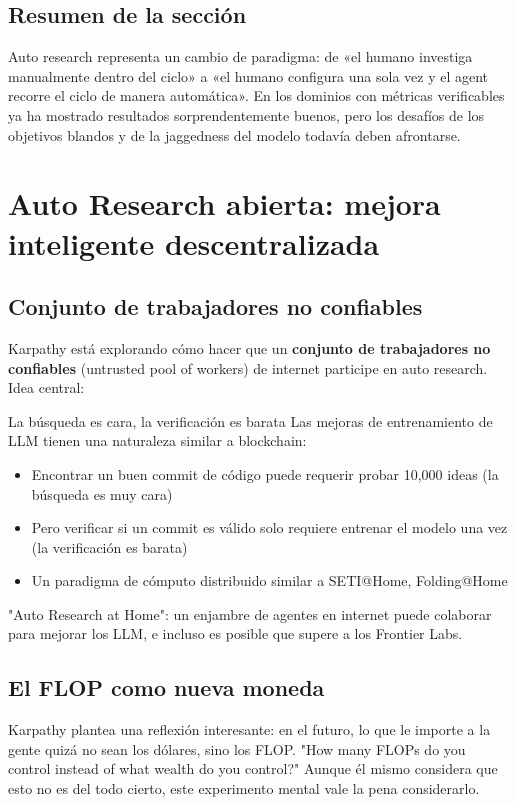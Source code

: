 \documentclass[a4paper]{article}
\begin{document}
\subsection{Resumen de la sección}

Auto research representa un cambio de paradigma: de «el humano investiga manualmente dentro del ciclo» a «el humano configura una sola vez y el agent recorre el ciclo de manera automática». En los dominios con métricas verificables ya ha mostrado resultados sorprendentemente buenos, pero los desafíos de los objetivos blandos y de la jaggedness del modelo todavía deben afrontarse.
\section{Auto Research abierta: mejora inteligente descentralizada}

\subsection{Conjunto de trabajadores no confiables}

Karpathy está explorando cómo hacer que un \textbf{conjunto de trabajadores no confiables} (untrusted pool of workers) de internet participe en auto research. Idea central:

\begin{importantbox}{La búsqueda es cara, la verificación es barata}
Las mejoras de entrenamiento de LLM tienen una naturaleza similar a blockchain:
\begin{itemize}
    \item Encontrar un buen commit de código puede requerir probar 10,000 ideas (la búsqueda es muy cara)
    \item Pero verificar si un commit es válido solo requiere entrenar el modelo una vez (la verificación es barata)
    \item Un paradigma de cómputo distribuido similar a SETI@Home, Folding@Home
\end{itemize}
"Auto Research at Home": un enjambre de agentes en internet puede colaborar para mejorar los LLM, e incluso es posible que supere a los Frontier Labs.
\end{importantbox}

\subsection{El FLOP como nueva moneda}

Karpathy plantea una reflexión interesante: en el futuro, lo que le importe a la gente quizá no sean los dólares, sino los FLOP. "How many FLOPs do you control instead of what wealth do you control?" Aunque él mismo considera que esto no es del todo cierto, este experimento mental vale la pena considerarlo.
\end{document}
